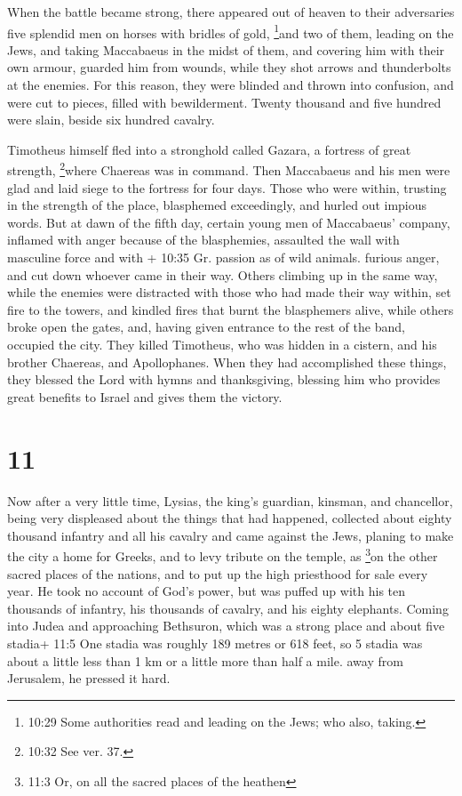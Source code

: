  When the battle became strong, there appeared out of
heaven to their adversaries five splendid men on horses with bridles of
gold, \footnote{10:29 Some authorities read and leading on the Jews; who
  also, taking.}and two of them, leading on the Jews,  and
taking Maccabaeus in the midst of them, and covering him with their own
armour, guarded him from wounds, while they shot arrows and thunderbolts
at the enemies. For this reason, they were blinded and thrown into
confusion, and were cut to pieces, filled with bewilderment.
 Twenty thousand and five hundred were slain, beside six
hundred cavalry.

 Timotheus himself fled into a stronghold called Gazara, a
fortress of great strength, \footnote{10:32 See ver. 37.}where Chaereas
was in command.  Then Maccabaeus and his men were glad and
laid siege to the fortress for four days.  Those who were
within, trusting in the strength of the place, blasphemed exceedingly,
and hurled out impious words.  But at dawn of the fifth
day, certain young men of Maccabaeus' company, inflamed with anger
because of the blasphemies, assaulted the wall with masculine force and
with + 10:35 Gr. passion as of wild animals. furious anger, and cut down
whoever came in their way.  Others climbing up in the same
way, while the enemies were distracted with those who had made their way
within, set fire to the towers, and kindled fires that burnt the
blasphemers alive, while others broke open the gates, and, having given
entrance to the rest of the band, occupied the city.  They
killed Timotheus, who was hidden in a cistern, and his brother Chaereas,
and Apollophanes.  When they had accomplished these things,
they blessed the Lord with hymns and thanksgiving, blessing him who
provides great benefits to Israel and gives them the victory.

\hypertarget{section-10}{%
\section{11}\label{section-10}}

 Now after a very little time, Lysias, the king's guardian,
kinsman, and chancellor, being very displeased about the things that had
happened,  collected about eighty thousand infantry and all
his cavalry and came against the Jews, planing to make the city a home
for Greeks,  and to levy tribute on the temple, as
\footnote{11:3 Or, on all the sacred places of the heathen}on the other
sacred places of the nations, and to put up the high priesthood for sale
every year.  He took no account of God's power, but was
puffed up with his ten thousands of infantry, his thousands of cavalry,
and his eighty elephants.  Coming into Judea and approaching
Bethsuron, which was a strong place and about five stadia+ 11:5 One
stadia was roughly 189 metres or 618 feet, so 5 stadia was about a
little less than 1 km or a little more than half a mile. away from
Jerusalem, he pressed it hard.

